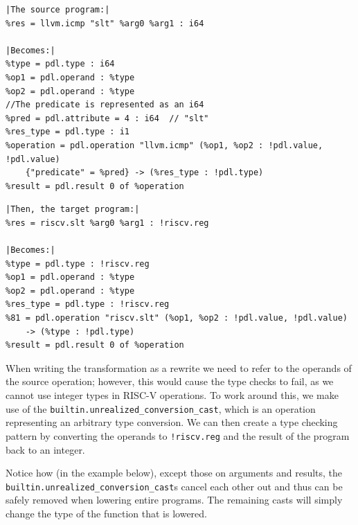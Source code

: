 \begin{verbatim}
|The source program:|
%res = llvm.icmp "slt" %arg0 %arg1 : i64 

|Becomes:|
%type = pdl.type : i64
%op1 = pdl.operand : %type
%op2 = pdl.operand : %type
//The predicate is represented as an i64
%pred = pdl.attribute = 4 : i64  // "slt"
%res_type = pdl.type : i1
%operation = pdl.operation "llvm.icmp" (%op1, %op2 : !pdl.value, !pdl.value) 
    {"predicate" = %pred} -> (%res_type : !pdl.type)
%result = pdl.result 0 of %operation
\end{verbatim}

\begin{verbatim}
|Then, the target program:|
%res = riscv.slt %arg0 %arg1 : !riscv.reg

|Becomes:|
%type = pdl.type : !riscv.reg
%op1 = pdl.operand : %type
%op2 = pdl.operand : %type
%res_type = pdl.type : !riscv.reg
%81 = pdl.operation "riscv.slt" (%op1, %op2 : !pdl.value, !pdl.value) 
    -> (%type : !pdl.type)
%result = pdl.result 0 of %operation
\end{verbatim}

When writing the transformation as a rewrite we need to refer to the operands of the source operation;
however, this would cause the type checks to fail, as we cannot use integer types in RISC-V operations.
To work around this, we make use of the \newline \texttt{builtin.unrealized\_conversion\_cast}, which is an operation
representing an arbitrary type conversion. We can then create a type checking pattern by converting 
the operands to \texttt{!riscv.reg} and the result of the program back to an integer. 

Notice how (in the example below), except those on arguments and results, the \newline
\texttt{builtin.unrealized\_conversion\_cast}s cancel each other out and thus can be safely removed
when lowering entire programs. The remaining casts will simply change the type of the function 
that is lowered.

